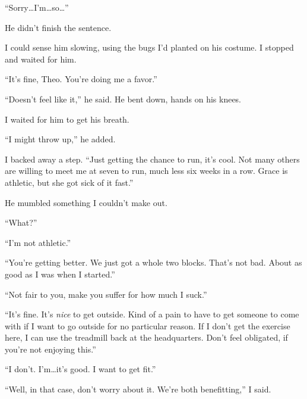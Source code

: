 





``Sorry\ldots I'm\ldots so\ldots''



He didn't finish the sentence.



I could sense him slowing, using the bugs I'd planted on his costume.  I stopped and waited for him.



``It's fine, Theo.  You're doing me a favor.''



``Doesn't feel like it,'' he said.  He bent down, hands on his knees.



I waited for him to get his breath.



``I might throw up,'' he added.



I backed away a step.  ``Just getting the chance to run, it's cool.  Not many others are willing to meet me at seven to run, much less six weeks in a row.  Grace is athletic, but she got sick of it fast.''



He mumbled something I couldn't make out.



``What?''



``I'm not athletic.''



``You're getting better.  We just got a whole two blocks.  That's not bad.  About as good as I was when I started.''



``Not fair to you, make you suffer for how much I suck.''



``It's fine.  It's \emph{nice }to get outside.  Kind of a pain to have to get someone to come with if I want to go outside for no particular reason.  If I don't get the exercise here, I can use the treadmill back at the headquarters.  Don't feel obligated, if you're not enjoying this.''



``I don't.  I'm\ldots it's good.  I want to get fit.''



``Well, in that case, don't worry about it.  We're both benefitting,'' I said.




